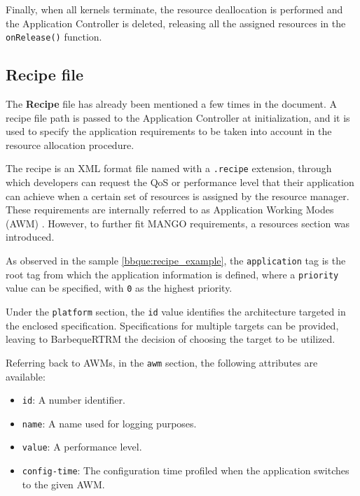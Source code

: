 Finally, when all kernels terminate, the resource deallocation is performed and the Application Controller is deleted, releasing all the assigned resources in the \linebreak \texttt{onRelease()} function.

\subsection{Recipe file} \label{bbque:recipe}

The \textbf{Recipe} file has already been mentioned a few times in the document. A recipe file path is passed to the Application Controller at initialization, and it is used to specify the application requirements to be taken into account in the resource allocation procedure.

The recipe is an XML \cite{xml} format file named with a \texttt{.recipe} extension, through which developers can request the QoS or performance level that their application can achieve when a certain set of resources is assigned by the resource manager. These requirements are internally referred to as Application Working Modes (AWM) \cite{mango_exploring_manycore_architectures}. However, to further fit MANGO requirements, a resources section was introduced.

As observed in the sample \ref{bbque:recipe_example}, the \texttt{application} tag is the root tag from which the application information is defined, where a \texttt{priority} value can be specified, with \texttt{0} as the highest priority.

Under the \texttt{platform} section, the \texttt{id} value identifies the architecture targeted in the enclosed specification. Specifications for multiple targets can be provided, leaving to BarbequeRTRM the decision of choosing the target to be utilized.

Referring back to AWMs, in the \texttt{awm} section, the following attributes are available:

\begin{itemize}
    \item \texttt{id}: A number identifier.
    \item \texttt{name}: A name used for logging purposes.
    \item \texttt{value}: A performance level.
    \item \texttt{config-time}: The configuration time profiled when the application switches to the given AWM.
\end{itemize}

